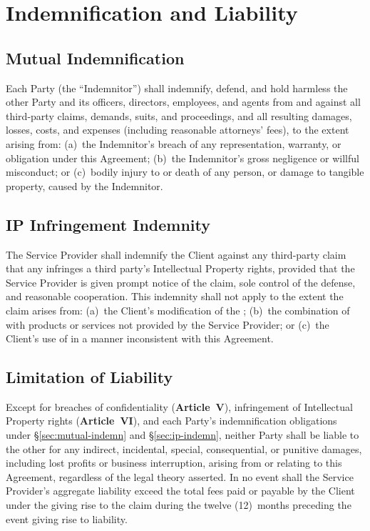 \section{Indemnification and Liability}

\subsection{Mutual Indemnification}
Each Party (the ``Indemnitor'') shall indemnify, defend, and hold harmless the other Party and its officers, directors, employees, and agents from and against all third-party claims, demands, suits, and proceedings, and all resulting damages, losses, costs, and expenses (including reasonable attorneys' fees), to the extent arising from: (a)~the Indemnitor's breach of any representation, warranty, or obligation under this Agreement; (b)~the Indemnitor's gross negligence or willful misconduct; or (c)~bodily injury to or death of any person, or damage to tangible property, caused by the Indemnitor.

\subsection{IP Infringement Indemnity}
The Service Provider shall indemnify the Client against any third-party claim that any  infringes a third party's Intellectual Property rights, provided that the Service Provider is given prompt notice of the claim, sole control of the defense, and reasonable cooperation. This indemnity shall not apply to the extent the claim arises from: (a)~the Client's modification of the ; (b)~the combination of  with products or services not provided by the Service Provider; or (c)~the Client's use of  in a manner inconsistent with this Agreement.

\subsection{Limitation of Liability}
Except for breaches of confidentiality (\textbf{Article~V}), infringement of Intellectual Property rights (\textbf{Article~VI}), and each Party's indemnification obligations under \S\ref{sec:mutual-indemn} and \S\ref{sec:ip-indemn}, neither Party shall be liable to the other for any indirect, incidental, special, consequential, or punitive damages, including lost profits or business interruption, arising from or relating to this Agreement, regardless of the legal theory asserted. In no event shall the Service Provider's aggregate liability exceed the total fees paid or payable by the Client under the  giving rise to the claim during the twelve (12)~months preceding the event giving rise to liability.
\label{sec:mutual-indemn}
\label{sec:ip-indemn}

